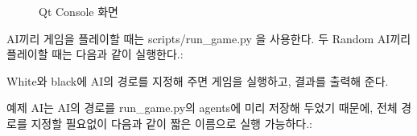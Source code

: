 \documentclass[letterpaper,10pt,english]{sphinxmanual}
\begin{document}
\begin{figure}[htbp]
\centering
\capstart

\noindent{}
\caption{Qt Console 화면}\label{\detokenize{02-microchess_ai_platform:qt-console-example}}\label{\detokenize{02-microchess_ai_platform:id10}}\end{figure}


AI끼리 게임을 플레이할 때는 scripts/run\_game.py 을 사용한다. 두 Random AI끼리 플레이할 때는 다음과 같이 실행한다.:

%
\begin{sphinxVerbatim}[commandchars=\\\{\}]
   
\end{sphinxVerbatim}

White와 black에 AI의 경로를 지정해 주면 게임을 실행하고, 결과를 출력해 준다.

예제 AI는 AI의 경로를 run\_game.py의 agents에 미리 저장해 두었기 때문에, 전체 경로를 지정할 필요없이 다음과 같이 짧은 이름으로 실행 가능하다.:

%
\begin{sphinxVerbatim}[commandchars=\\\{\}]
   
\end{sphinxVerbatim}
\end{document}
